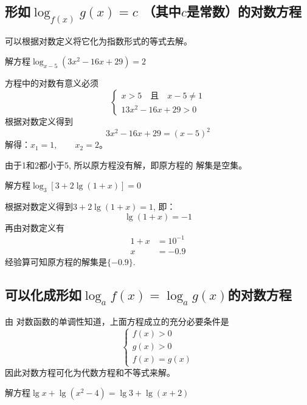 \subsection{形如$\log_{f(x)}g(x)=c$\; （其中$c$是常数）的对数方程}

可以根据对数定义将它化为指数形式的等式去解。



\begin{example}
    解方程$\log_{x-5}(3x^2-16x+29)=2$
\end{example}

\begin{solution}
  方程中的对数有意义必须
  \[\begin{cases}
    x>5\quad\text{且}\quad  x-5\ne 1 \\
    13x^2-16x+29>0
  \end{cases}\] 
  根据对数定义得到
 \[ 3x^2-16x+29=(x-5)^2\]
  解得：$x_1=1,\qquad x_2=2$。

  由于1和2都小于5, 所以原方程没有解，即原方程的
  解集是空集。
\end{solution}


\begin{example}
    解方程$\log_3[3+2\lg(1+x)]=0$
\end{example}

\begin{solution}
  根据对数定义得到$3+2\lg(1+x)=1$,
  即：
  \[  \lg(1+x)=-1\]
  再由对数定义有
\[\begin{split}
  1+x&=10^{-1}\\
  x&=-0.9
\end{split}\]  
  经验算可知原方程的解集是$\{-0.9\}$.
\end{solution}

\subsection{可以化成形如$\log_a f(x)=\log_a g(x)$的对数方程}

由
对数函数的单调性知道，上面方程成立的充分必要条件是
\[\begin{cases}
  f(x)>0\\
  g(x)>0\\
  f(x)=g(x)
\end{cases}\]
因此对数方程可化为代数方程和不等式来解。

\begin{example}
  解方程$\lg x+\lg(x^2-4)=\lg3+\lg(x+2)$
\end{example}

